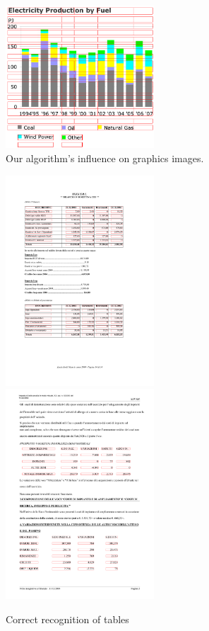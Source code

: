 \begin{figure}[t]
\centering
\includegraphics[width=15em]{img/results/otherErr3.png}
\caption{Our algorithm's influence on graphics images.}
\label{fig:errors}
\end{figure}

\begin{figure}[t]
\centering
\includegraphics[width=15em]{img/results/goodRes1.png}
\includegraphics[width=15em]{img/results/goodRes2.png}
\caption{Correct recognition of tables }
\label{fig:errors}
\end{figure}